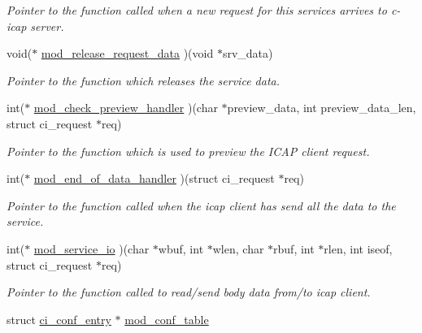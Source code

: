 \begin{DoxyCompactItemize}
\begin{DoxyCompactList}\small\item\em Pointer to the function called when a new request for this services arrives to c-\/icap server. \item\end{DoxyCompactList}\item 
void($\ast$ \hyperlink{structci__service__module_ae809353c47dbfe742be12fe78d716373}{mod\_\-release\_\-request\_\-data} )(void $\ast$srv\_\-data)
\begin{DoxyCompactList}\small\item\em Pointer to the function which releases the service data. \item\end{DoxyCompactList}\item 
int($\ast$ \hyperlink{structci__service__module_a2a50b9701b4d11e996167c7c992256da}{mod\_\-check\_\-preview\_\-handler} )(char $\ast$preview\_\-data, int preview\_\-data\_\-len, struct ci\_\-request $\ast$req)
\begin{DoxyCompactList}\small\item\em Pointer to the function which is used to preview the ICAP client request. \item\end{DoxyCompactList}\item 
int($\ast$ \hyperlink{structci__service__module_a4308d4de90013030d311b56d01ba1d53}{mod\_\-end\_\-of\_\-data\_\-handler} )(struct ci\_\-request $\ast$req)
\begin{DoxyCompactList}\small\item\em Pointer to the function called when the icap client has send all the data to the service. \item\end{DoxyCompactList}\item 
int($\ast$ \hyperlink{structci__service__module_ac79b8c4bd560ee1f5cb21ca604c90978}{mod\_\-service\_\-io} )(char $\ast$wbuf, int $\ast$wlen, char $\ast$rbuf, int $\ast$rlen, int iseof, struct ci\_\-request $\ast$req)
\begin{DoxyCompactList}\small\item\em Pointer to the function called to read/send body data from/to icap client. \item\end{DoxyCompactList}\item 
struct \hyperlink{structci__conf__entry}{ci\_\-conf\_\-entry} $\ast$ \hyperlink{structci__service__module_a51f0f2512caf13fc7c39337e2060686d}{mod\_\-conf\_\-table}

\end{DoxyCompactItemize}
